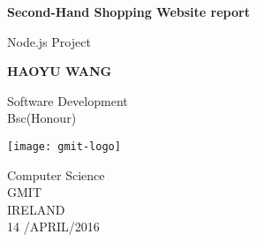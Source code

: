 \begin{titlepage}
    \begin{center}
        \vspace*{1cm}
       
        \huge
        \textbf{Second-Hand Shopping Website report}
        
        \large
        \vspace{0.5cm}
        Node.js Project
        
        \vspace{1.5cm}
        
        \textbf{HAOYU WANG}
        
        \vfill
        
        Software Development\\
        Bsc(Honour)
        
        \vspace{0.8cm}
        
        \texttt{[image: gmit-logo]}
        
        Computer Science\\
        GMIT\\
        IRELAND\\
        14 /APRIL/2016  
        
    \end{center}
\end{titlepage}